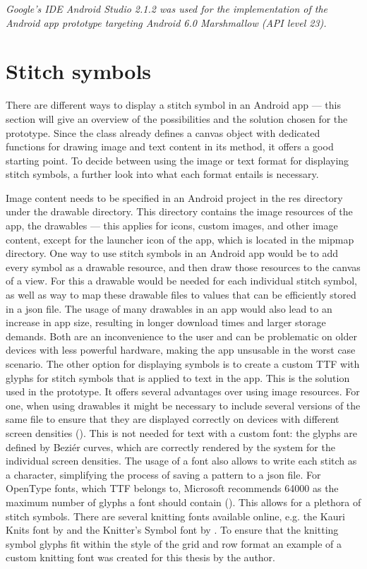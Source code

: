 \textit{Google’s IDE Android Studio 2.1.2 was used for the implementation of the Android app prototype targeting Android 6.0 Marshmallow (\gls{API} level 23).}

\section{Stitch symbols}
There are different ways to display a stitch symbol in an Android app --- this section will give an overview of the possibilities and the solution chosen for the prototype. 
Since the  class already defines a canvas object with dedicated functions for drawing image and text content in its  method, it offers a good starting point. To decide between using the image or text format for displaying stitch symbols, a further look into what each format entails is necessary.

Image content needs to be specified in an Android project in the res directory under the drawable directory. This directory contains the image resources of the app, the drawables --- this applies for icons, custom images, and other image content, except for the launcher icon of the app, which is located in the mipmap directory. One way to use stitch symbols in an Android app would be to add every symbol as a drawable resource, and then draw those resources to the canvas of a view. For this a drawable would be needed for each individual stitch symbol, as well as way to map these drawable files to values that can be efficiently stored in a \gls{json} file. The usage of many drawables in an app would also lead to an increase in app size, resulting in longer download times and larger storage demands. Both are an inconvenience to the user and can be problematic on older devices with less powerful hardware, making the app unsusable in the worst case scenario.
The other option for displaying symbols is to create a custom \gls{TTF} with glyphs for stitch symbols that is applied to text in the app. This is the solution used in the prototype. It offers several advantages over using image resources. For one, when using drawables it might be necessary to include several versions of the same file to ensure that they are displayed correctly on devices with different screen densities (\cite{android_screen_densities}). This is not needed for text with a custom font: the glyphs are defined by Beziér curves, which are correctly rendered by the system for the individual screen densities. The usage of a font also allows to write each stitch as a character, simplifying the process of saving a pattern to a \gls{json} file. For OpenType fonts, which \gls{TTF} belongs to, Microsoft recommends 64000 as the maximum number of glyphs a font should contain (\cite{microsoft_max_glyphs}). This allows for a plethora of stitch symbols. There are several knitting fonts available online, e.g. the Kauri Knits font by \cite{kauri} and the Knitter's Symbol font by \cite{xenakis}. To ensure that the knitting symbol glyphs fit within the style of the grid and row format an example of a custom knitting font was created for this thesis by the author.

